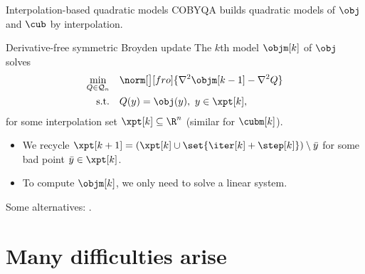 \documentclass[optimization]{common/talk}
\begin{document}
\begin{frame}{Interpolation-based quadratic models}
    COBYQA builds \alert{quadratic} models of $\obj$ and $\cub$ by interpolation.

    \begin{block}{Derivative-free symmetric Broyden update \cite{Powell_2004}}
        The $k$th model $\objm[k]$ of $\obj$ solves
        \begin{align*}
            \min_{Q \in \mathcal{Q}_n}  & \quad \norm[\big][fro]{\nabla^2 \objm[k - 1] - \nabla^2 Q}\\
            \textrm{s.t.}               & \quad Q(y) = \obj(y), ~ y \in \xpt[k],
        \end{align*}
        for some interpolation set $\xpt[k] \subseteq \R^n$ (similar for $\cubm[k]$).
    \end{block}

    \begin{itemize}
        \item We \alert{recycle} $\xpt[k + 1] = ( \xpt[k] \cup \set{\iter[k] + \step[k]} ) \setminus {\bar{y}}$ for some bad point $\bar{y} \in \xpt[k]$.
        \item To compute $\objm[k]$, we only need to solve a \alert{linear} system.
    \end{itemize}

    Some alternatives: \cite{Conn_Scheinberg_Toint_1997a,Conn_Scheinberg_Toint_1997b,Conn_Scheinberg_Toint_1998,Wild_2008,Bandeira_Scheinberg_Vicente_2012,Zhang_2014,Xie_Yuan_2023}.
\end{frame}

\section{Many difficulties arise}
\end{document}
